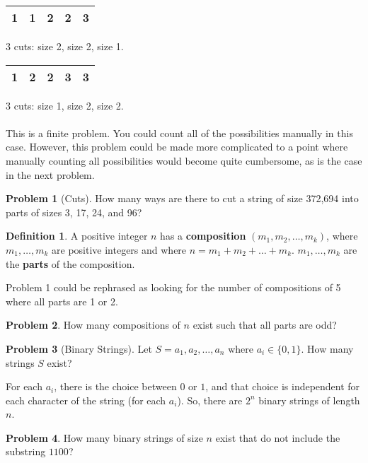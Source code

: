 \documentclass[]{article}
\theoremstyle{definition}
\newtheorem{problem}{Problem}[section]
\newtheorem*{defn}{Definition}
\begin{document}
			\begin{tabular}{|c|c|c|c|c|}
				\hline
				1 & 1 & 2 & 2 & 3 \\
				\hline
			\end{tabular}
			3 cuts: size 2, size 2, size 1.
		
			\begin{tabular}{|c|c|c|c|c|}
				\hline
				1 & 2 & 2 & 3 & 3 \\
				\hline
			\end{tabular}
			3 cuts: size 1, size 2, size 2.
			\\ \\
			This is a finite problem. You could count all of the possibilities manually in this case. However, this problem could be made more complicated to a point where manually counting all possibilities would become quite cumbersome, as is the case in the next problem.
		
			\begin{problem}[Cuts]
				How many ways are there to cut a string of size 372,694 into parts of sizes 3, 17, 24, and 96?
			\end{problem}
		
			\begin{defn}
				A positive integer $n$ has a \textbf{composition} $(m_1, m_2, \ldots, m_k)$, where $m_1, \ldots, m_k$ are positive integers and where $n = m_1 + m_2 + \ldots + m_k$. $m_1, \ldots, m_k$ are the \textbf{parts} of the composition.
			\end{defn}
		
			Problem 1 could be rephrased as looking for the number of compositions of 5 where all parts are 1 or 2.
		
			\begin{problem}
				How many compositions of $n$ exist such that all parts are odd?
			\end{problem}
		
			\begin{problem}[Binary Strings]
				Let $S = a_1, a_2, \ldots, a_n$ where $a_i \in \{0, 1\}$. How many strings $S$ exist?
			\end{problem}
		
			For each $a_i$, there is the choice between $0$ or $1$, and that choice is independent for each character of the string (for each $a_i$). So, there are $2^n$ binary strings of length $n$.
		
			\begin{problem}
				How many binary strings of size $n$ exist that do not include the substring $1100$?
			\end{problem}
		
\end{document}
